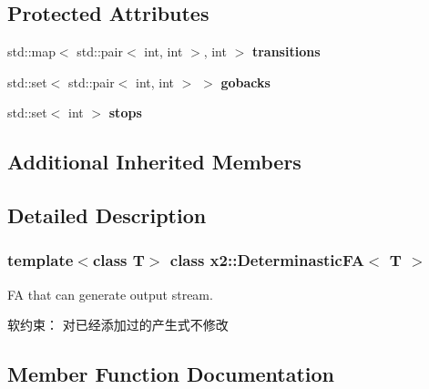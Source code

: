 \subsection*{Protected Attributes}
\begin{DoxyCompactItemize}
\item 
\mbox{\label{classx2_1_1_determinastic_f_a_af9b7f7a6ed38d7611e1cb8c774617167}} 
std\+::map$<$ std\+::pair$<$ int, int $>$, int $>$ {\bfseries transitions}
\item 
\mbox{\label{classx2_1_1_determinastic_f_a_a2a7e3e6089bb8873125bb2983ff90ea7}} 
std\+::set$<$ std\+::pair$<$ int, int $>$ $>$ {\bfseries gobacks}
\item 
\mbox{\label{classx2_1_1_determinastic_f_a_abcb3e36327c33dde71139e8156734149}} 
std\+::set$<$ int $>$ {\bfseries stops}
\end{DoxyCompactItemize}
\subsection*{Additional Inherited Members}


\subsection{Detailed Description}
\subsubsection*{template$<$class T$>$\newline
class x2\+::\+Determinastic\+F\+A$<$ T $>$}

FA that can generate output stream.

软约束： 对已经添加过的产生式不修改 

\subsection{Member Function Documentation}
\mbox{\label{classx2_1_1_determinastic_f_a_adbd0f99ea29d31abd9f9675ee5b9fdef}} 

